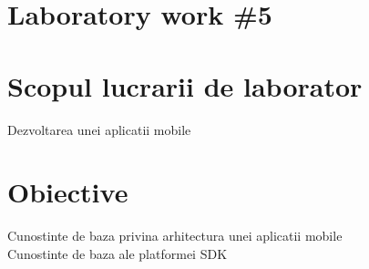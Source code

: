 \section*{Laboratory work \#5}

\section{Scopul lucrarii de laborator}
Dezvoltarea unei aplicatii mobile
\section{Obiective}

Cunostinte de baza privina arhitectura unei aplicatii mobile\\

Cunostinte de baza ale platformei SDK

\clearpage